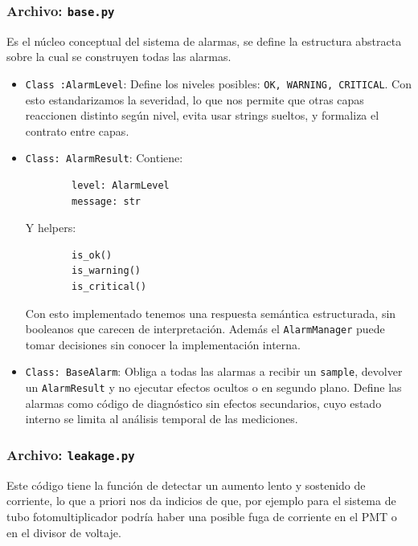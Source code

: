 \documentclass{article}
\begin{document}
\subsubsection{Archivo: \texttt{base.py}}
Es el núcleo conceptual del sistema de alarmas, se define la estructura abstracta sobre la cual se construyen todas las alarmas. \\

\begin{itemize}
    \item \texttt{Class :AlarmLevel}: \newline
    Define los niveles posibles: \texttt{OK, WARNING, CRITICAL}. Con esto estandarizamos la severidad, lo que nos permite que otras capas reaccionen distinto según nivel, evita usar strings sueltos, y formaliza el contrato entre capas.
    \item \texttt{Class: AlarmResult}: \newline
    Contiene:
    \begin{lstlisting}
        level: AlarmLevel
        message: str
    \end{lstlisting}
    Y helpers:
    \begin{lstlisting}
        is_ok()
        is_warning()
        is_critical()
    \end{lstlisting}
    Con esto implementado tenemos una respuesta semántica estructurada, sin booleanos que carecen de interpretación. Además el \texttt{AlarmManager} puede tomar decisiones sin conocer la implementación interna.\\
    \item \texttt{Class: BaseAlarm}: \newline
    Obliga a todas las alarmas a recibir un \texttt{sample}, devolver un \texttt{AlarmResult} y no ejecutar efectos ocultos o en segundo plano. Define las alarmas como código de diagnóstico sin efectos secundarios, cuyo estado interno se limita al análisis temporal de las mediciones.\\
\end{itemize}

\subsubsection{Archivo: \texttt{leakage.py}}

Este código tiene la función de detectar un aumento lento y sostenido de corriente, lo que a priori nos da indicios de que, por ejemplo para el sistema de tubo fotomultiplicador podría haber una posible fuga de corriente en el PMT o en el divisor de voltaje. \\
\end{document}
